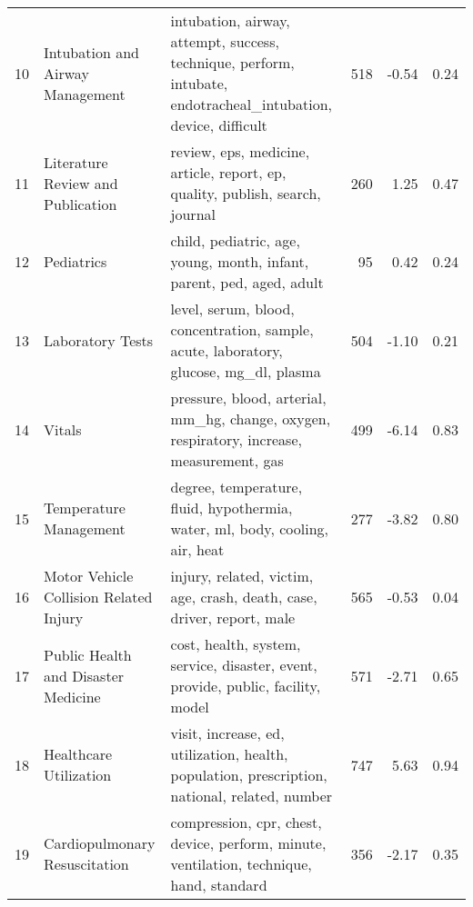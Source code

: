 \begin{tabular}{rllrrr}
    10 &             Intubation and Airway Management &               intubation, airway, attempt, success, technique, perform, intubate, endotracheal\_intubation, device, difficult &             518 &             -0.54 &  0.24 \\
    11 &            Literature Review and Publication &                                                review, eps, medicine, article, report, ep, quality, publish, search, journal &             260 &              1.25 &  0.47 \\
    12 &                                   Pediatrics &                                                        child, pediatric, age, young, month, infant, parent, ped, aged, adult &              95 &              0.42 &  0.24 \\
    13 &                             Laboratory Tests &                                        level, serum, blood, concentration, sample, acute, laboratory, glucose, mg\_dl, plasma &             504 &             -1.10 &  0.21 \\
    14 &                                       Vitals &                                    pressure, blood, arterial, mm\_hg, change, oxygen, respiratory, increase, measurement, gas &             499 &             -6.14 &  0.83 \\
    15 &                       Temperature Management &                                                 degree, temperature, fluid, hypothermia, water, ml, body, cooling, air, heat &             277 &             -3.82 &  0.80 \\
    16 &       Motor Vehicle Collision Related Injury &                                                       injury, related, victim, age, crash, death, case, driver, report, male &             565 &             -0.53 &  0.04 \\
    17 &          Public Health and Disaster Medicine &                                             cost, health, system, service, disaster, event, provide, public, facility, model &             571 &             -2.71 &  0.65 \\
    18 &                       Healthcare Utilization &                                visit, increase, ed, utilization, health, population, prescription, national, related, number &             747 &              5.63 &  0.94 \\
    19 &                Cardiopulmonary Resuscitation &                                     compression, cpr, chest, device, perform, minute, ventilation, technique, hand, standard &             356 &             -2.17 &  0.35 \\

\end{tabular}
